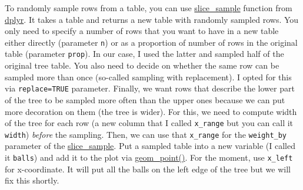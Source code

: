 \documentclass[
]{book}
\begin{document}
To randomly sample rows from a table, you can use \href{https://dplyr.tidyverse.org/reference/slice.html}{slice\_sample} function from \href{https://dplyr.tidyverse.org/index.html}{dplyr}. It takes a table and returns a new table with randomly sampled rows. You only need to specify a number of rows that you want to have in a new table either directly (parameter \texttt{n}) or as a proportion of number of rows in the original table (parameter \texttt{prop}). In our case, I used the latter and sampled half of the original tree table. You also need to decide on whether the same row can be sampled more than once (so-called sampling with replacement). I opted for this via \texttt{replace=TRUE} parameter. Finally, we want rows that describe the lower part of the tree to be sampled more often than the upper ones because we can put more decoration on them (the tree is wider). For this, we need to compute width of the tree for each row (a new column that I called \texttt{x\_range} but you can call it \texttt{width}) \emph{before} the sampling. Then, we can use that \texttt{x\_range} for the \texttt{weight\_by} parameter of the \href{https://dplyr.tidyverse.org/reference/slice.html}{slice\_sample}. Put a sampled table into a new variable (I called it \texttt{balls}) and add it to the plot via \href{https://ggplot2.tidyverse.org/reference/geom_point.html}{geom\_point()}. For the moment, use \texttt{x\_left} for x-coordinate. It will put all the balls on the left edge of the tree but we will fix this shortly.
\end{document}
